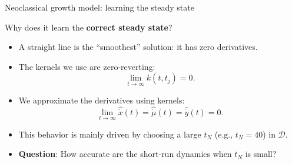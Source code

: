 \documentclass[aspectratio=169,10pt]{beamer}
\newcommand{\emphcolor}[1]{\textbf{\textcolor{emphcolorval}{#1}}}
\begin{document}
\begin{frame}{Neoclassical growth model: learning the steady state}
	
	Why does it learn the \emphcolor{correct steady state}?
	
	\begin{itemize}
		\item A straight line is the ``smoothest'' solution: it has zero derivatives.
		
		\item The kernels we use are zero-reverting:
		\[
		\lim_{t \rightarrow \infty} k(t,t_j) = 0.
		\]
		
		\item We approximate the derivatives using kernels:
		\[
		\lim_{t \rightarrow \infty} \hat{\dot{x}}(t)
		= \hat{\dot{\mu}}(t)
		= \hat{\dot{y}}(t)
		= 0.
		\]
		
		\item This behavior is mainly driven by choosing a large $t_N$ (e.g., $t_N = 40$) in $\mathcal{D}$.
		\vspace{0.1in}
		
		\item \emphcolor{Question}: How accurate are the short-run dynamics when $t_N$ is small?
	\end{itemize}	
\end{frame}
\end{document}
